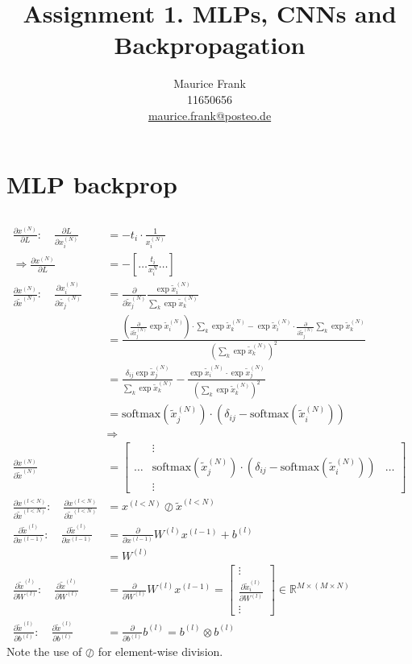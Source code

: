 \documentclass{article}
\title{Assignment 1. MLPs, CNNs and Backpropagation}
\author{%
  Maurice Frank\\
  11650656\\
  \href{mailto:maurice.frank@posteo.de}{maurice.frank@posteo.de} \\
}
\newcommand\bM[1]{\ensuremath{\begin{bmatrix}#1\end{bmatrix}}}
\newcommand\·{\ensuremath{\cdot}}
\newcommand\…{\ensuremath{\ldots}}
\renewcommand\t{\ensuremath{\times}}
\newcommand\f[2]{\ensuremath{\frac{#1}{#2}}}
\newcommand\pf[2]{\ensuremath{\frac{\partial {#1}}{\partial {#2}}}}
\newcommand\1{\ensuremath{\mathds{1}}}
\newcommand\R{\ensuremath{\mathds{R}}}
\begin{document}
\maketitle
\section{MLP backprop}
\subsection{}
\subsubsection{}
\begin{align}
  \pf{x^{(N)}}L:\quad
  \pf L{x_i^{(N)}} &= -t_i\·\f{1}{x_i^{(N)}}\\
  \Rightarrow \pf{x^{(N)}}L &= -[\hdots \f{t_i}{x_i^{N}}\hdots]\\
  \pf{x^{(N)}}{\tilde{x}^{(N)}}:\quad
  \pf{x_i^{(N)}}{\tilde{x_j}^{(N)}} &= \pf{}{\tilde{x}_j^{(N)}}\f{\exp{\tilde{x}_i^{(N)}}}{\sum_k \exp{\tilde{x}_k^{(N)}}}\\
  &= \f{(\pf{}{\tilde{x}^{(N)}_j}\exp{\tilde{x}^{(N)}_i})\·\sum_k\exp{\tilde{x}^{(N)}_k} - \exp{\tilde{x}^{(N)}_i}\·\pf{}{\tilde{x}^{(N)}_j}\sum_k\exp{\tilde{x}^{(N)}_k}}{(\sum_k\exp{\tilde{x}^{(N)}_k})^2}\\
  &= \f{\delta_{ij}\exp{\tilde{x}^{(N)}_j}}{\sum_k\exp{\tilde{x}^{(N)}_k}} - \f{\exp{\tilde{x}^{(N)}_i}\·\exp{\tilde{x}^{(N)}_j}}{(\sum_k\exp{\tilde{x}^{(N)}_k})^2}\\
  &= \text{softmax}(\tilde{x}^{(N)}_j)\·(\delta_{ij} - \text{softmax}(\tilde{x}^{(N)}_i))\\
  &\Rightarrow\\
  \pf{x^{(N)}}{\tilde{x}^{(N)}} &= \bM{& \vdots &\\\hdots & \text{softmax}(\tilde{x}^{(N)}_j)\·(\delta_{ij} - \text{softmax}(\tilde{x}^{(N)}_i)) & \hdots\\ & \vdots &}\\
  \pf{x^{(l<N)}}{\tilde{x}^{(l<N)}}:\quad
  \pf{x^{(l<N)}}{\tilde{x}^{(l<N)}} &= x^{(l<N)}\oslash\tilde{x}^{(l<N)}\\
  \pf{\tilde{x}^{(l)}}{x^{(l-1)}}:\quad
  \pf{\tilde{x}^{(l)}}{x^{(l-1)}} &= \pf{}{x^{(l-1)}} W^{(l)}x^{(l-1)} + b^{(l)}\\&=W^{(l)}\\
  \pf{\tilde{x}^{(l)}}{W^{(l)}}:\quad
  \pf{\tilde{x}^{(l)}}{W^{(l)}} &= \pf{}{W^{(l)}}W^{(l)}x^{(l-1)} = \bM{\vdots\\\pf{\tilde{x}^{(l)}_i}{W^{(l)}}\\\vdots}\in\R^{M\t (M\t N)} \\
  \pf{\tilde{x}^{(l)}}{b^(l)}:\quad
  \pf{\tilde{x}^{(l)}}{b^(l)} &= \pf{}{b^(l)}b^{(l)} = b^{(l)} \otimes b^{(l)}
\end{align}
Note the use of $\oslash$ for element-wise division.

\subsubsection{}
\begin{align}
\end{align}
\end{document}
